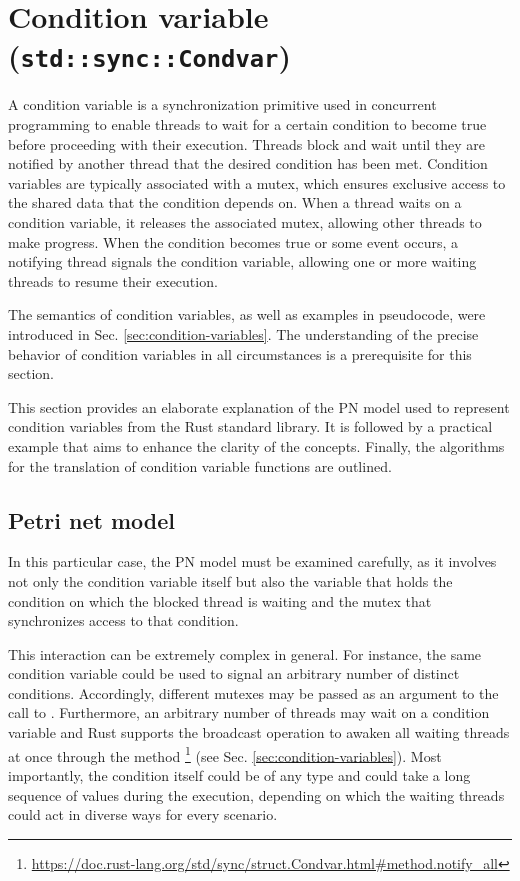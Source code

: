 \section{Condition variable (\texttt{std::sync::Condvar})}

A condition variable is a synchronization primitive used in concurrent programming
to enable threads to wait for a certain condition
to become true before proceeding with their execution.
Threads block and wait until they are notified by another thread
that the desired condition has been met.
Condition variables are typically associated with a mutex,
which ensures exclusive access to the shared data that the condition depends on.
When a thread waits on a condition variable, it releases the associated mutex,
allowing other threads to make progress.
When the condition becomes true or some event occurs,
a notifying thread signals the condition variable,
allowing one or more waiting threads to resume their execution.

The semantics of condition variables, as well as examples in pseudocode,
were introduced in Sec. \ref{sec:condition-variables}.
The understanding of the precise behavior of condition variables in all circumstances
is a prerequisite for this section.

This section provides an elaborate explanation of the \acrshort{PN} model
used to represent condition variables from the Rust standard library.
It is followed by a practical example that aims to enhance the clarity of the concepts.
Finally, the algorithms for the translation of condition variable functions are outlined.

\subsection{Petri net model}

In this particular case, the \acrshort{PN} model must be examined carefully,
as it involves not only the condition variable itself
but also the variable that holds the condition
on which the blocked thread is waiting and the mutex
that synchronizes access to that condition.

This interaction can be extremely complex in general.
For instance, the same condition variable could be used
to signal an arbitrary number of distinct conditions.
Accordingly, different mutexes may be passed as an argument to the call to .
Furthermore, an arbitrary number of threads may wait on a condition variable and
Rust supports the broadcast operation to awaken all waiting threads at once
through the method \footnote{\url{https://doc.rust-lang.org/std/sync/struct.Condvar.html\#method.notify_all}}
(see Sec. \ref{sec:condition-variables}).
Most importantly, the condition itself could be of any type
and could take a long sequence of values during the execution,
depending on which the waiting threads could act in diverse ways for every scenario.

